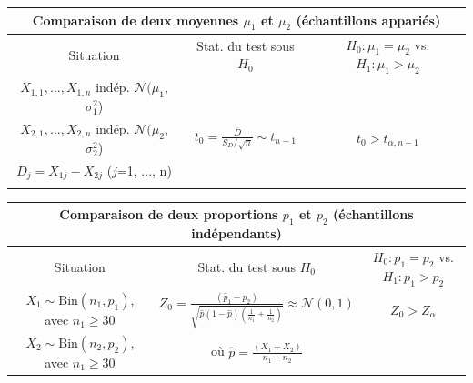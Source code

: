 \documentclass[12pt,french]{article}
\begin{document}
{\begin{center}
\begin{tabular}{|c|c|c|}
\hline
 \multicolumn{3}{|c|}{{\bf Comparaison de deux moyennes
$\mu_1$ et $\mu_2$ (échantillons appariés)}}
\\
\hline Situation & Stat. du test sous $H_0$ & $H_{0}:\mu_1=\mu_2$ vs. $H_{1}:\mu_1>\mu_2$
\\

\hline \hline 
$X_{1,1}, ..., X_{1,n}$ indép. $\mathcal{N}(\mu_1$, $\sigma^2_1$)& & \\
$X_{2,1}, ..., X_{2,n}$ indép. $\mathcal{N}(\mu_2$, $\sigma^2_2$)
&$\displaystyle t_0 = \frac{\overline D}{S_D/\sqrt n} \sim
t_{n-1}$ & $t_0 > t_{\alpha, n-1}$
\\
$D_j = X_{1j} - X_{2j}$  ({\small $j$=1, ...,
n})& &
\\


\hline \multicolumn{3}{c}{ }
\\

\end{tabular}
\end{center}


\begin{center}
\begin{tabular}{|c|c|c|}
\hline \multicolumn{3}{|c|}{{\bf Comparaison de deux proportions
$p_{1}$ et $p_{2}$ (échantillons indépendants)}}
\\
\hline Situation & Stat. du test sous $H_0$& $H_{0}: p_{1} =
p_{2}$ vs. $H_{1}:p_{1} > p_{2}$
\\

\hline \hline 
$X_{1}\sim \text{Bin}(n_1,p_1)$, avec $n_1\geq 30$ & $\displaystyle Z_0 = \frac{(\hat
p_1 - \hat p_2)} {\sqrt{\displaystyle\hat p (1-\hat p) \left(
\frac{1}{n_1} + \frac{1}{n_2} \right)}} \approx
\mathcal{N}(0,1)$ & $Z_0 > Z_{\alpha}$
\\
$X_{2}\sim \text{Bin}(n_2,p_2)$, avec $n_1\geq 30$ & où $\displaystyle \hat p =
\frac{(X_1 + X_2)}{n_1 + n_2}$  &
\\

\hline
\end{tabular}
\end{center}
}
\newpage
\end{document}
